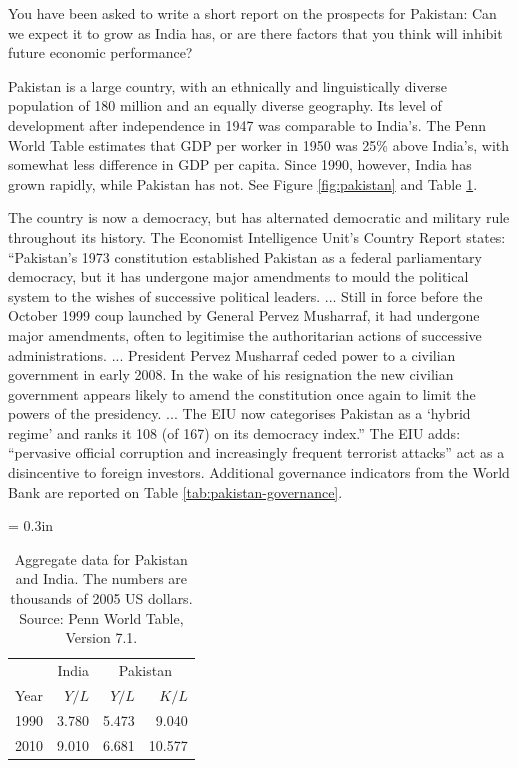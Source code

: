 \documentclass[letterpaper,12pt]{exam}
\begin{document}
\begin{questions}
You have been asked to write a short report on the prospects
for Pakistan:  Can we expect it to grow as India has, or are there
factors that you think will inhibit future economic performance?

Pakistan is a large country, with
an ethnically and linguistically diverse population of 180 million
and an equally diverse geography.
Its level of development after independence in 1947
was comparable to India's.
The Penn World Table estimates that GDP per worker in 1950
was 25\% above India's, with somewhat less difference in
GDP per capita.
Since 1990, however, India has grown rapidly, while Pakistan has not.
See Figure \ref{fig:pakistan} and Table \ref{tab:pakistan}.


The country is now a democracy,
but has alternated democratic and military rule throughout its history.
The Economist Intelligence Unit's Country Report states:
``Pakistan's 1973  constitution established Pakistan as a federal parliamentary
democracy, but it has undergone major amendments to mould the political
system to the wishes of successive political leaders. ...
Still in force before the October 1999 coup launched by General Pervez Musharraf, it
had undergone major amendments, often to legitimise the authoritarian actions
of successive administrations. ...
President Pervez Musharraf
ceded power to a civilian government in early  2008.
In the wake of his resignation the new civilian
government appears likely to amend the constitution once again to limit the
powers of the presidency.
...
The EIU now categorises  Pakistan as a `hybrid regime'
and ranks it 108 (of 167) on its democracy index.''
The EIU adds:
``pervasive official
corruption and increasingly frequent terrorist attacks''
act as a disincentive to foreign investors.
Additional governance indicators from the World Bank
are reported on Table \ref{tab:pakistan-governance}.


\begin{table}
    \centering
    \tabcolsep = 0.3in
    \begin{tabular}{lrrr}
    \toprule
    & India & \multicolumn{2}{c}{Pakistan}  \\
    \cmidrule(r){2-2} \cmidrule{3-4}
    Year     &  $Y/L$ &  $ Y/L $   &  $K/L$   \\
    \midrule
    1990 &  3.780   &   5.473  &   9.040   \\
    2010 &  9.010   &   6.681  &   10.577  \\
    \bottomrule
    \end{tabular}
    \caption{Aggregate data for Pakistan and India.
    The numbers are thousands of 2005 US dollars.
    Source:  Penn World Table, Version 7.1.}
    \label{tab:pakistan}
\end{table}


\end{questions}
\end{document}
